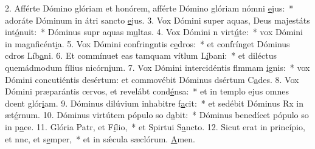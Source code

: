 2. Afférte Dómino glóriam et honórem, afférte Dómino glóriam nómni \uline{e}jus:~* adoráte Dóminum in átri sancto \uline{e}jus.
3. Vox Dómini super aquas, Deus majestáts int\uline{ó}nuit:~* Dóminus supr aquas m\uline{u}ltas.
4. Vox Dómini n virt\uline{ú}te:~* vox Dómini in magnficént\uline{i}a.
5. Vox Dómini confringntis c\uline{e}dros:~* et confrínget Dóminus cdros Líb\uline{a}ni.
6. Et commínuet eas tamquam vítlum L\uline{í}bani:~* et diléctus quemádmodum fílius nicórn\uline{i}um.
7. Vox Dómini intercidéntis flmmam \uline{i}gnis:~* vox Dómini concutiéntis desértum: et commovébit Dóminus dsértum C\uline{a}des.
8. Vox Dómini præparántis cervos, et revelábt cond\uline{é}nsa:~* et in templo ejus omnes dcent glór\uline{i}am.
9. Dóminus dilúvium inhabitre f\uline{a}cit:~* et sedébit Dóminus Rx in æt\uline{é}rnum.
10. Dóminus virtútem pópulo so d\uline{a}bit:~* Dóminus benedícet pópulo so in p\uline{a}ce.
11. Glória Patr, et F\uline{í}lio,~* et Spirtui S\uline{a}ncto.
12. Sicut erat in princípio, et nnc, et s\uline{e}mper,~* et in sǽcula sæclórum. \uline{A}men.
